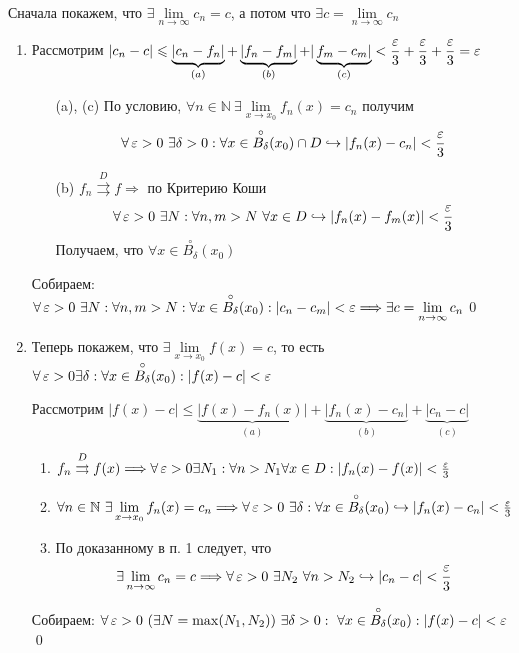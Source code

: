 \documentclass[a4paper]{article}
\begin{document}
\proof Сначала покажем, что $\exists\lim\limits_{n\to\infty }c_n=c$, а потом что $\exists c=\lim\limits_{n\to\infty }c_n$
\begin{enumerate}
    \item Рассмотрим $|c_n-c|\leqslant\underbrace{|c_n-f_n|}_{(a)}+\underbrace{|f_n-f_m|}_{(b)}+|\underbrace{f_m-c_m|}_{(c)}<\displaystyle\frac{\operatorname{\varepsilon}}{3}+\frac{\operatorname{\varepsilon}}{3}+\frac{\operatorname{\varepsilon}}{3}=\operatorname{\varepsilon}$
    \begin{enumerate}
        \item[(a), (c)] По условию, $\forall n\in\mathbb{N}\ \exists \lim\limits_{x\to x_0} f_n(x)=c_n$ получим 
        \begin{equation*}
            \forall\ve>0\ \exists\delta>0:\forall x\in \overset{\circ}{B_{\delta}}(x_0)\cap D\hookrightarrow|f_n(x)-c_n|<\frac{\ve}{3}
        \end{equation*}
        \item[(b)] $f_n\overset{D}{\rightrightarrows} f\Longrightarrow$ по Критерию Коши 
        \begin{equation*}
            \forall\operatorname{\varepsilon}>0\ \exists N:\forall n,m>N\ \forall x\in D\hookrightarrow|f_n(x)-f_m(x)|<\frac{\operatorname{\varepsilon}}{3}
        \end{equation*}
        Получаем, что $\forall x\in \overset{\circ}{B_{\delta}}(x_0)$
    \end{enumerate}
    Собираем: $\forall\operatorname{\varepsilon}>0\ \exists N:\forall n,m>N:\forall x\in \overset{\circ}{B_{\delta}}(x_0):|c_n-c_m|<\operatorname{\varepsilon}\Longrightarrow\exists c=\lim\limits_{n\to\infty} c_n$\qed

    \item Теперь покажем, что $\exists\lim\limits_{x\to x_0}f(x)=c$, то есть $\forall\operatorname{\varepsilon}>0\exists\delta:\forall x\in \overset{\circ}{B_{\delta}}(x_0): |f(x)-c|<\operatorname{\varepsilon}$

    Рассмотрим $|f(x)-c|\leqslant\underbrace{|f(x)-f_n(x)|}_{(a)}+\underbrace{|f_n(x)-c_n|}_{(b)}+\underbrace{|c_n-c|}_{(c)}$
    \begin{enumerate}
        \item $f_n\overset{D}{\rightrightarrows} f(x)\Longrightarrow\forall\operatorname{\varepsilon}>0\exists N_1:\forall n>N_1\forall x\in D:|f_n(x)-f(x)|<\frac{\operatorname{\varepsilon}}{3}$
        \item $\forall n\in\mathbb{N}\ \exists\lim\limits_{x\to x_0}f_n(x)=c_n\Longrightarrow \forall \ve>0\ \exists\delta:\forall x\in \overset{\circ}{B_{\delta}}(x_0)\hookrightarrow|f_n(x)-c_n|<\frac{\ve}{3}$
        \item По доказанному в п. 1 следует, что
        \begin{equation*}
            \exists\lim_{n\to\infty} c_n=c\Longrightarrow \forall\operatorname{\varepsilon}>0\ \exists N_2\ \forall n>N_2\hookrightarrow|c_n-c|<\frac{\operatorname{\varepsilon}}{3}
        \end{equation*}
    \end{enumerate}

    Собираем: $\forall\operatorname{\varepsilon}>0\ (\exists N=\max(N_1,N_2))\ \exists\delta>0:\ \forall x\in\overset{\circ}{B_{\delta}}(x_0):|f(x)-c|<\operatorname{\varepsilon}$\qed
\end{enumerate}
\end{document}
